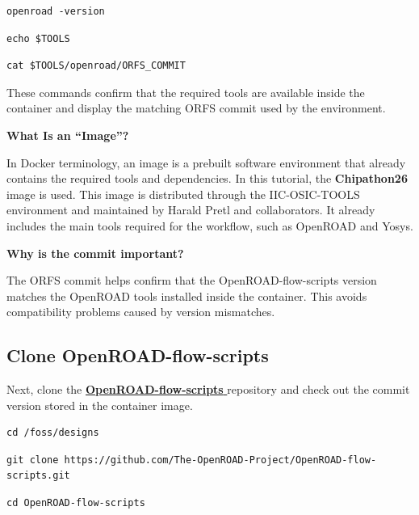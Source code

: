 \documentclass[11pt]{article}
\begin{document}
\begin{lstlisting}
openroad -version
\end{lstlisting}

\begin{lstlisting}
echo $TOOLS
\end{lstlisting}

\begin{lstlisting}
cat $TOOLS/openroad/ORFS_COMMIT
\end{lstlisting}

These commands confirm that the required tools are available inside the container and display the matching ORFS commit used by the environment.

\textbf{What Is an “Image”?}

In Docker terminology, an image is a prebuilt software environment that already contains the required tools and dependencies.
In this tutorial, the \textbf{Chipathon26} image is used. This image is distributed through the IIC-OSIC-TOOLS environment and maintained by Harald Pretl and collaborators. It already includes the main tools required for the workflow, such as OpenROAD and Yosys.

\textbf{Why is the commit important?}

The ORFS commit helps confirm that the OpenROAD-flow-scripts version matches the OpenROAD tools installed inside the container. This avoids compatibility problems caused by version mismatches.

\subsection{Clone OpenROAD-flow-scripts}

Next, clone the \href{https://github.com/The-OpenROAD-Project/OpenROAD-flow-scripts.git}{
\textcolor{blue!70!black}{\textbf{OpenROAD-flow-scripts}}
} repository and check out the commit version stored in the container image.

\begin{lstlisting}
cd /foss/designs
\end{lstlisting}

\begin{lstlisting}
git clone https://github.com/The-OpenROAD-Project/OpenROAD-flow-scripts.git
\end{lstlisting}

\begin{lstlisting}
cd OpenROAD-flow-scripts
\end{lstlisting}
\end{document}
